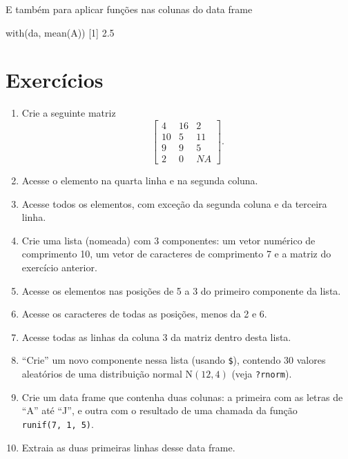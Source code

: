 \documentclass[
  10pt,
  a4paper]{book}
\newenvironment{Shaded}{\begin{snugshade}}{\end{snugshade}}
\newcommand{\DecValTok}[1]{\textcolor[rgb]{0.00,0.00,0.81}{#1}}
\newcommand{\FloatTok}[1]{\textcolor[rgb]{0.00,0.00,0.81}{#1}}
\newcommand{\FunctionTok}[1]{\textcolor[rgb]{0.00,0.00,0.00}{#1}}
\newcommand{\NormalTok}[1]{#1}
\providecommand{\tightlist}{%
  \setlength{\itemsep}{0pt}\setlength{\parskip}{0pt}}
\begin{document}
E também para aplicar funções nas colunas do data frame

\begin{Shaded}
\begin{Highlighting}[]
\FunctionTok{with}\NormalTok{(da, }\FunctionTok{mean}\NormalTok{(A))}
\NormalTok{[}\DecValTok{1}\NormalTok{] }\FloatTok{2.5}
\end{Highlighting}
\end{Shaded}

\hypertarget{exercuxedcios-6}{%
\section*{Exercícios}\label{exercuxedcios-6}}


\begin{enumerate}
\def\labelenumi{\arabic{enumi}.}
\tightlist
\item
  Crie a seguinte matriz
  \[\left[ \begin{array}{ccc}
           4 & 16 & 2 \\
           10 & 5 & 11 \\
           9 & 9 & 5 \\
           2 & 0 & NA
           \end{array} \right].\]
\item
  Acesse o elemento na quarta linha e na segunda coluna.
\item
  Acesse todos os elementos, com exceção da segunda coluna e da
  terceira linha.
\item
  Crie uma lista (nomeada) com 3 componentes: um vetor numérico de
  comprimento 10, um vetor de caracteres de comprimento 7 e a matriz
  do exercício anterior.
\item
  Acesse os elementos nas posições de 5 a 3 do primeiro componente da
  lista.
\item
  Acesse os caracteres de todas as posições, menos da 2 e 6.
\item
  Acesse todas as linhas da coluna 3 da matriz dentro desta lista.
\item
  ``Crie'' um novo componente nessa lista (usando \texttt{\$}), contendo 30
  valores aleatórios de uma distribuição normal \(\text{N}(12, 4)\)
  (veja \texttt{?rnorm}).
\item
  Crie um data frame que contenha duas colunas: a primeira com as
  letras de ``A'' até ``J'', e outra com o resultado de uma chamada da
  função \texttt{runif(7,\ 1,\ 5)}.
\item
  Extraia as duas primeiras linhas desse data frame.

\end{enumerate}
\end{document}
